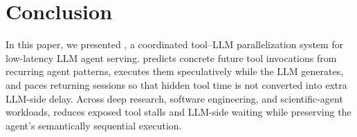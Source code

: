 \section{Conclusion}

In this paper, we presented \sys, a coordinated tool--LLM parallelization system for low-latency LLM agent serving.
\sys predicts concrete future tool invocations from recurring agent patterns, executes them speculatively while the LLM generates, and paces returning sessions so that hidden tool time is not converted into extra LLM-side delay.
Across deep research, software engineering, and scientific-agent workloads, \sys reduces exposed tool stalls and LLM-side waiting while preserving the agent's semantically sequential execution.
